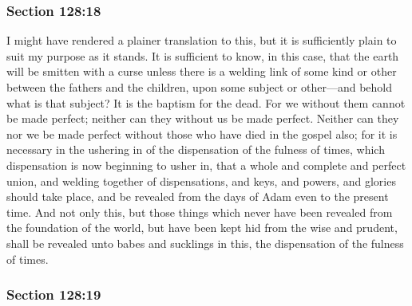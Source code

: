
	\subsubsection{Section 128:18} %
		\label{DC128-18}

		I might have rendered a plainer translation to this, but it is sufficiently plain to suit my purpose as it stands. It is sufficient to know, in this case, that the earth will be smitten with a curse unless there is a welding link of some kind or other between the fathers and the children, upon some subject or other---and behold what is that subject? It is the baptism for the dead. For we without them cannot be made perfect; neither can they without us be made perfect. Neither can they nor we be made perfect without those who have died in the gospel also; for it is necessary in the ushering in of the dispensation of the fulness of times, which dispensation is now beginning to usher in, that a whole and complete and perfect union, and welding together of dispensations, and keys, and powers, and glories should take place, and be revealed from the days of Adam even to the present time. And not only this, but those things which never have been revealed from the foundation of the world, but have been kept hid from the wise and prudent, shall be revealed unto babes and sucklings in this, the dispensation of the fulness of times.


	\subsubsection{Section 128:19} %
		\label{DC128-19}

